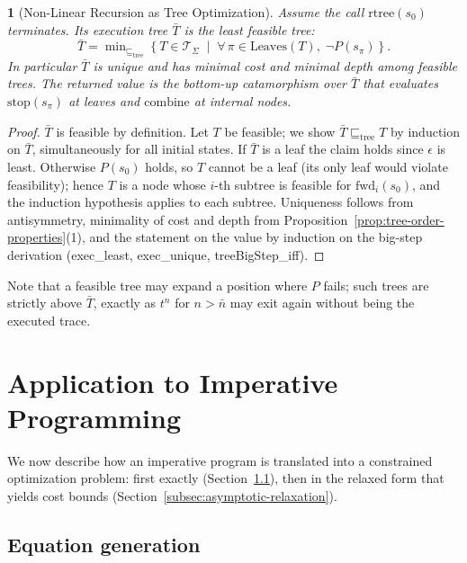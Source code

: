 \documentclass[oneside,english]{amsart}
\numberwithin{equation}{section}
\numberwithin{figure}{section}
\theoremstyle{plain}
\theoremstyle{definition}
\theoremstyle{plain}
\newtheorem{prop}[thm]{\protect\propositionname}
\theoremstyle{remark}
\theoremstyle{plain}
\theoremstyle{definition}
\theoremstyle{plain}
\theoremstyle{remark}
\newcommand{\lean}[1]{{\ttfamily\small #1}}
\providecommand{\propositionname}{Proposition}
\begin{document}
\begin{prop}[Non-Linear Recursion as Tree Optimization]\label{prop:tree-optimization}
Assume the call $\text{rtree}(s_0)$ terminates. Its execution tree $\bar{T}$ is the least feasible tree:
\[
\bar{T} = \min\nolimits_{\sqsubseteq_{\text{tree}}} \left\{ T \in \mathcal{T}_\Sigma \;\middle|\; \forall\, \pi \in \text{Leaves}(T), \; \neg P\left(s_\pi\right) \right\}.
\]
In particular $\bar{T}$ is unique and has minimal cost and minimal depth among feasible trees. The returned value is the bottom-up catamorphism over $\bar{T}$ that evaluates $\text{stop}(s_\pi)$ at leaves and $\text{combine}$ at internal nodes.
\end{prop}
\begin{proof}
$\bar{T}$ is feasible by definition. Let $T$ be feasible; we show $\bar{T} \sqsubseteq_{\text{tree}} T$ by induction on $\bar{T}$, simultaneously for all initial states. If $\bar{T}$ is a leaf the claim holds since $\epsilon$ is least. Otherwise $P(s_0)$ holds, so $T$ cannot be a leaf (its only leaf would violate feasibility); hence $T$ is a node whose $i$-th subtree is feasible for $\text{fwd}_i(s_0)$, and the induction hypothesis applies to each subtree. Uniqueness follows from antisymmetry, minimality of cost and depth from Proposition~\ref{prop:tree-order-properties}(1), and the statement on the value by induction on the big-step derivation (\lean{exec\_\allowbreak least}, \lean{exec\_\allowbreak unique}, \lean{treeBigStep\_\allowbreak iff}).
\end{proof}

Note that a feasible tree may expand a position where $P$ fails; such trees are strictly above $\bar{T}$, exactly as $t^n$ for $n > \bar{n}$ may exit again without being the executed trace.

\section{Application to Imperative Programming}
\label{sec:application}

We now describe how an imperative program is translated into a constrained optimization problem: first exactly (Section~\ref{subsec:equation-generation}), then in the relaxed form that yields cost bounds (Section~\ref{subsec:asymptotic-relaxation}).

\subsection{Equation generation}
\label{subsec:equation-generation}
\end{document}
